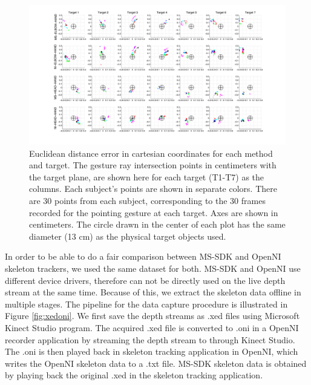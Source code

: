 \documentclass[12pt]{gatech-thesis}
\begin{document}
\begin{landscape}



\begin{figure}[ht!]
\centering
\includegraphics[width=1.5\textwidth]{pics/projections.pdf}
\caption{Euclidean distance error in cartesian coordinates for each method and target. The gesture ray intersection points in centimeters with the target plane, are shown here for each target (T1-T7) as the columns.  Each subject's points are shown in separate colors.  There are 30 points from each subject, corresponding to the 30 frames recorded for the pointing gesture at each target.  Axes are shown in centimeters.  The circle drawn in the center of each plot has the same diameter (13 cm) as the physical target objects used.}
\label{fig:euclidean_projections}
\end{figure}

\end{landscape}

In order to be able to do a fair comparison between MS-SDK and OpenNI skeleton trackers, we used the same dataset for both. MS-SDK and OpenNI use different device drivers, therefore can not be directly used on the live depth stream at the same time. Because of this, we extract the skeleton data offline in multiple stages. The pipeline for the data capture procedure is illustrated in Figure \ref{fig:xedoni}. We first save the depth streams as .xed files using Microsoft Kinect Studio program. The acquired .xed file is converted to .oni in a OpenNI recorder application by streaming the depth stream to through Kinect Studio. The .oni is then played back in skeleton tracking application in OpenNI, which writes the OpenNI skeleton data to a .txt file. MS-SDK skeleton data is obtained by playing back the original .xed in the skeleton tracking application.
\end{document}
